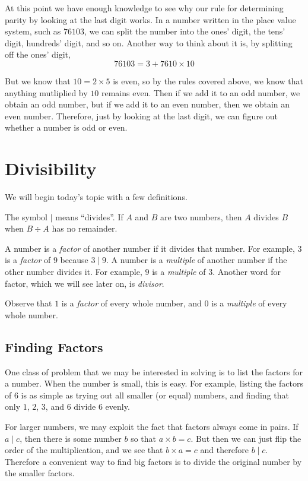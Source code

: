 \documentclass[a4paper,10pt]{report}
\begin{document}
At this point we have enough knowledge to see why our rule for determining
parity by looking at the last digit works. In a number written in the place
value system, such as \(76103\), we can split the number into the ones' digit,
the tens' digit, hundreds' digit, and so on. Another way to think about it is,
by splitting off the ones' digit, \[
 76103 = 3 + 7610 \times 10
\]

But we know that \(10=2\times5\) is even, so by the rules covered above, we
know that anything mutliplied by \(10\) remains even. Then if we add it to an
odd number, we obtain an odd number, but if we add it to an even number, then
we obtain an even number. Therefore, just by looking at the last digit, we can
figure out whether a number is odd or even.

\section{Divisibility}

We will begin today's topic with a few definitions.

The symbol \(\mid\) means ``divides''. If \(A\) and \(B\) are two numbers, then
\(A\) divides \(B\) when \(B \div A\) has no remainder.

A number is a \emph{factor} of another number if it divides that number. For
example, \(3\) is a \emph{factor} of \(9\) because \(3 \mid 9\). A number is a
\emph{multiple} of another number if the other number divides it. For example,
\(9\) is a \emph{multiple} of \(3\). Another word for factor, which we will see
later on, is \emph{divisor}.

Observe that \(1\) is a \emph{factor} of every whole number, and \(0\) is a
\emph{multiple} of every whole number.

\subsection{Finding Factors}

One class of problem that we may be interested in solving is to list the
factors for a number. When the number is small, this is easy. For example,
listing the factors of \(6\) is as simple as trying out all smaller (or equal)
numbers, and finding that only \(1\), \(2\), \(3\), and \(6\) divide \(6\)
evenly.

For larger numbers, we may exploit the fact that factors always come in pairs.
If \(a \mid c\), then there is some number \(b\) so that \(a \times b = c\).
But then we can just flip the order of the multiplication, and we see that \(b
\times a = c\) and therefore \(b \mid c\). Therefore a convenient way to find
big factors is to divide the original number by the smaller factors.
\end{document}
